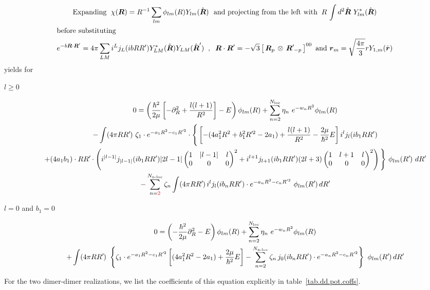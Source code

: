 \documentclass[onecolumn,preprint,superscriptaddress,nofootinbib,notitlepage,10pt,linenumbers]{revtex4-1}
\newcommand*{\mprime}{^{\prime}\mkern-1.2mu}
\newcommand{\red}[1]{\textcolor{red}{#1}}
\newcommand{\la}{\label}
\newcommand{\ve}[1]{\ensuremath{\boldsymbol{#1}}}
\newcommand{\coup}[3]{\left[\,#1\,\otimes\,#2\,\right]^{#3}}
\newcommand{\threej}[6]{ \begin{pmatrix}
   #1 & #2 & #3 \\
   #4 & #5 & #6 
  \end{pmatrix}}
\begin{document}
\begin{gather}
\text{Expanding}~\;\chi(\ve{R})=R^{-1}\sum_{lm}\phi_{lm}(R)Y_{lm}(\hat{\ve{R}})~
\text{~and projecting from the left with}\;\;
R\,\int d^2\hat{\ve{R}}~Y^*_{lm}(\hat{\ve{R}})\\
\intertext{before substituting}
e^{-b\ve{R}\cdot\ve{R}'}=4\pi\sum_{LM}i^Lj_L(ib RR')Y^*_{LM}(\hat{\ve{R}})Y_{LM}(\hat{\ve{R}}')\;\;,\;\;
\ve{R}\cdot\ve{R}'=-\sqrt{3}\coup{\ve{R}_p}{\ve{R}\mprime_{-p}}{00}~\text{and~}\ve{r}_m=\sqrt{\frac{4\pi}{3}}rY_{1,m}(\hat{\ve{r}})
\end{gather}
yields for
\begin{description}
	\item[$l\geq 0$]
\begin{subequations}\la{eq.rgm.sglnonloc.pw}
\begin{gather}
0=\left(\frac{\hbar^2}{2\mu}\left[-\partial^2_R+\frac{l(l+1)}{R^2}\right]-E\right)
\phi_{lm}(R)+\sum_{n=2}^{N_{\text{loc}}}\eta_n~e^{-w_nR^2}\phi_{lm}(R)\\
-\int
(4\pi RR\mprime )~\zeta_1 \cdot e^{-a_1R^2-c_1R'^2}
\cdot\Bigg\lbrace
\left[-(4a_1^2R^2+b_1^2R\mprime^2-2a_1)+\frac{l(l+1)}{R^2}-\frac{2\mu}{\hbar^2}E\right]
 i^l j_{l}(ib_1 RR')\nonumber\\
+(4a_1b_1)\cdot RR\mprime\cdot
 \left(i^{\vert l-1\vert} j_{\vert l-1\vert}(ib_1 RR') \vert 2l-1\vert
 \threej{1}{\vert l-1\vert}{l}{0}{0}{0}^2+
 i^{l+1} j_{l+1}(ib_1 RR') (2l+3)
 \threej{1}{l+1}{l}{0}{0}{0}^2\right)\Bigg\rbrace
~\phi_{lm}(R\mprime)~dR\mprime\la{eq.rgm.sglnonloc.pw.tex}\\
-\sum_{n=\red{2}}^{N_{\text{n-loc}}}\zeta_n\int
(4\pi RR\mprime)\,i^l j_l(ib_n RR')\cdot 
e^{-a_nR^2-c_nR'^2}~\phi_{lm}(R\mprime)\,dR\mprime\la{eq.rgm.sglnonloc.pw.noloc}
\end{gather}
\end{subequations}

	\item[$l= 0$ and $b_1=0$]
\begin{subequations}\la{eq.rgm.sglnonloc.sw}
\begin{gather}
0=\left(-\frac{\hbar^2}{2\mu}\partial^2_R-E\right)
\phi_{lm}(R)+\sum_{n=2}^{N_{\text{loc}}}\eta_n~e^{-w_nR^2}\phi_{lm}(R)\\
+\int (4\pi RR\mprime )~\left\lbrace\zeta_1 \cdot e^{-a_1R^2-c_1R'^2}
\left[(4a_1^2R^2-2a_1)+\frac{2\mu}{\hbar^2}E\right]
-\sum_{n=2}^{N_{\text{n-loc}}}\zeta_n\,j_0(ib_n RR')\cdot 
e^{-a_nR^2-c_nR'^2}\right\rbrace~\phi_{lm}(R\mprime)\,dR\mprime\la{eq.rgm.sglnonloc.sw.noloc}
\end{gather}
\end{subequations}
\end{description}
For the two dimer-dimer realizations, we list the coefficients of this equation explicitly in table~\ref{tab.dd.pot.coffs}.
\end{document}
